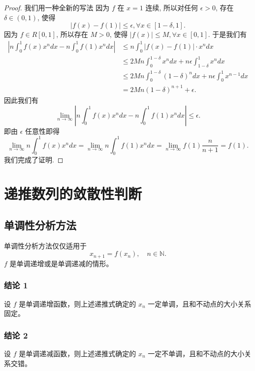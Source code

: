 \documentclass[lang=cn,10pt,thmcnt=section]{elegantbook}
\begin{document}
\begin{proof}
	我们用一种全新的写法
	因为 $f$ 在 $x=1$ 连续, 所以对任何 $\epsilon > 0$, 存在 $\delta \in (0, 1)$, 使得
$$ |f(x) - f(1)| \le \epsilon, \forall x \in [1-\delta, 1]. $$
因为 $f \in R[0, 1]$, 所以存在 $M > 0$, 使得 $|f(x)| \le M, \forall x \in [0, 1]$. 于是我们有
\begin{align*}
\left| n \int_0^1 f(x)x^n dx - n \int_0^1 f(1)x^n dx \right| &\le n \int_0^1 |f(x) - f(1)| \cdot x^n dx \\
&\le 2Mn \int_0^{1-\delta} x^n dx + n\epsilon \int_{1-\delta}^1 x^n dx \\
&\le 2Mn \int_0^{1-\delta} (1-\delta)^n dx + n\epsilon \int_0^1 x^{n-1} dx \\
&= 2Mn(1-\delta)^{n+1} + \epsilon.
\end{align*}
因此我们有
$$ \lim_{n \to \infty} \left| n \int_0^1 f(x)x^n dx - n \int_0^1 f(1)x^n dx \right| \le \epsilon. $$
即由 $\epsilon$ 任意性即得
$$ \lim_{n \to \infty} n \int_0^1 f(x)x^n dx = \lim_{n \to \infty} n \int_0^1 f(1)x^n dx = \lim_{n \to \infty} f(1) \frac{n}{n+1} = f(1). $$
我们完成了证明.


\end{proof}
\section{递推数列的敛散性判断}
\subsection{单调性分析方法}
单调性分析方法仅仅适用于
\[
x_{n+1} = f(x_n), \quad n \in \mathbb{N}.
\]
$f$ 是单调递增或是单调递减的情形。

\subsubsection*{结论 1}
设 $f$ 是单调递增函数，则上述递推式确定的 $x_n$ 一定单调，且和不动点的大小关系固定。



\subsubsection*{结论 2}
设 $f$ 是单调递减函数，则上述递推式确定的 $x_n$ 一定不单调，且和不动点的大小关系交错。
\end{document}
